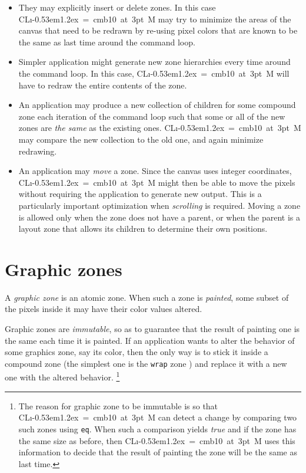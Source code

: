 \documentclass{report}
\def\Tiny{ \font\Tinyfont = cmb10 at 3pt \relax  \Tinyfont}
\def\clim{\textsf{CL{\i}\kern-0.53em\raise1.2ex\hbox{\Tiny 3}M}}
\def\code#1{\texttt{#1}}
\begin{document}
\begin{itemize}
\item They may explicitly insert or delete zones.  In this case
  \clim{} may try to minimize the areas of the canvas that need to be
  redrawn by re-using pixel colors that are known to be the same as
  last time around the command loop.

\item Simpler application might generate new zone hierarchies every
  time around the command loop.  In this case, \clim{} will have to
  redraw the entire contents of the zone.

\item An application may produce a new collection of children for some
  compound zone each iteration of the command loop such that some or
  all of the new zones are \emph{the same} as the existing ones.
  \clim{} may compare the new collection to the old one, and again
  minimize redrawing.

\item An application may \emph{move} a zone.  Since the canvas uses
  integer coordinates, \clim{} might then be able to move the pixels
  without requiring the application to generate new output.  This is a
  particularly important optimization when \emph{scrolling} is
  required.  Moving a zone is allowed only when the zone does not have
  a parent, or when the parent is a layout zone that allows its
  children to determine their own positions. 
\end{itemize}

\section{Graphic zones}
\label{sec-zones-graphic}

A \emph{graphic zone} is an atomic zone.  When such a zone is
\emph{painted}, some subset of the pixels inside it may have their
color values altered.

Graphic zones are \emph{immutable}, so as to guarantee that the result
of painting one is the same each time it is painted.  If an
application wants to alter the behavior of some graphics zone, say its
color, then the only way is to stick it inside a compound zone (the
simplest one is the \code{wrap} zone )
and replace it with a new one with the altered behavior.%
\footnote{The reason for graphic zone to be immutable is so that
  \clim{} can detect a change by comparing two such zones using
  \code{eq}.  When such a comparison yields \emph{true} and if the
  zone has the same size as before, then \clim{} uses this information
  to decide that the result of painting the zone will be the same as
  last time.}
\end{document}
